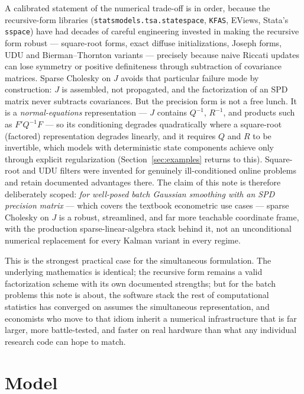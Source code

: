 \documentclass[11pt]{article}
\begin{document}
A calibrated statement of the numerical trade-off is in order,
because the recursive-form libraries
(\texttt{statsmodels.tsa.statespace}, \texttt{KFAS}, EViews,
Stata's \texttt{sspace}) have had decades of careful engineering
invested in making the recursive form robust --- square-root
forms, exact diffuse initializations, Joseph forms, UDU and
Bierman--Thornton variants \citep{Bierman1977} --- precisely
because naive Riccati updates can lose symmetry or positive
definiteness through subtraction of covariance matrices.  Sparse
Cholesky on $J$ avoids that particular failure mode by
construction: $J$ is assembled, not propagated, and the
factorization of an SPD matrix never subtracts covariances.  But
the precision form is not a free lunch.  It is a
\emph{normal-equations} representation --- $J$ contains
$Q^{-1}$, $R^{-1}$, and products such as $F'Q^{-1}F$ --- so its
conditioning degrades quadratically where a square-root
(factored) representation degrades linearly, and it requires
$Q$ and $R$ to be invertible, which models with deterministic
state components achieve only through explicit regularization
(Section~\ref{sec:examples} returns to this).  Square-root and
UDU filters were invented for genuinely ill-conditioned online
problems and retain documented advantages there.  The claim of
this note is therefore deliberately scoped: \emph{for well-posed
batch Gaussian smoothing with an SPD precision matrix} --- which
covers the textbook econometric use cases --- sparse Cholesky on
$J$ is a robust, streamlined, and far more teachable coordinate
frame, with the production sparse-linear-algebra stack behind it,
not an unconditional numerical replacement for every Kalman
variant in every regime.

This is the strongest practical case for the simultaneous
formulation.  The underlying mathematics is identical; the
recursive form remains a valid factorization scheme with its own
documented strengths; but for the batch problems this note is
about, the software stack the rest of computational statistics
has converged on assumes the simultaneous representation, and
economists who move to that idiom inherit a numerical
infrastructure that is far larger, more battle-tested, and faster
on real hardware than what any individual research code can hope
to match.

\section{Model}
\label{sec:model}
\end{document}
